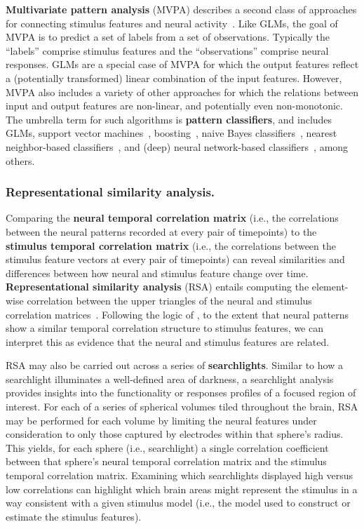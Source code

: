 \documentclass{llmxive}
\begin{document}
\textbf{Multivariate pattern analysis} (MVPA) describes a second class
of approaches for connecting stimulus features and neural
activity~\citep{HaxbEtal01, NormEtal06b}.  Like GLMs, the goal of MVPA
is to predict a set of labels from a set of observations.  Typically
the ``labels'' comprise stimulus features and the ``observations''
comprise neural responses.  GLMs are a special case of MVPA for which
the output features reflect a (potentially transformed) linear
combination of the input features.  However, MVPA also includes a
variety of other approaches for which the relations between input and
output features are non-linear, and potentially even non-monotonic.
The umbrella term for such algorithms is \textbf{pattern classifiers},
and includes GLMs, support vector machines~\citep{BoseEtal92},
boosting~\citep{Scha03}, naive Bayes classifiers~\citep{CortVapn95,
  Nobl04, LeeEtal12}, nearest neighbor-based
classifiers~\citep{FixHodg51}, and (deep) neural network-based
classifiers~\citep{ZengEtal14, Wan90}, among others.


\subsubsection{Representational similarity analysis.}
Comparing the \textbf{neural temporal correlation matrix} (i.e., the
correlations between the neural patterns recorded at every pair of
timepoints) to the \textbf{stimulus temporal correlation matrix}
(i.e., the correlations between the stimulus feature vectors at every
pair of timepoints) can reveal similarities and differences between
how neural and stimulus feature change over time.
\textbf{Representational similarity analysis} (RSA) entails computing
the element-wise correlation between the upper triangles of the neural
and stimulus correlation matrices~\citep{KrieEtal08b}.  Following the
logic of \cite{KrieEtal08b}, to the extent that neural patterns show a
similar temporal correlation structure to stimulus features, we can
interpret this as evidence that the neural and stimulus features are
related.

RSA may also be carried out across a series of \textbf{searchlights}.
Similar to how a searchlight illuminates a well-defined area of
darkness, a searchlight analysis provides insights into the
functionality or responses profiles of a focused region
of interest.  For each of a series of spherical volumes tiled
throughout the brain, RSA may be performed for each volume by limiting
the neural features under consideration to only those captured by
electrodes within that sphere's radius.  This yields, for each sphere
(i.e., searchlight) a single correlation coefficient between that
sphere's neural temporal correlation matrix and the stimulus temporal
correlation matrix.  Examining which searchlights displayed high
versus low correlations can highlight which brain areas might
represent the stimulus in a way consistent with a given stimulus
model (i.e., the model used to construct or estimate the stimulus
features).
\end{document}
